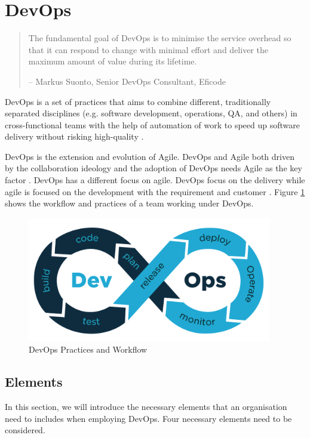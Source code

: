 \section{DevOps}
\begin{quotation}
    The fundamental goal of DevOps is to minimise the service overhead so that it can respond to change with minimal effort and deliver the maximum amount of value during its lifetime.
    \begin{flushright}
        -- Markus Suonto, Senior DevOps Consultant, Eficode
    \end{flushright}
\end{quotation}
\label{devops}
DevOps is a set of practices that aims to combine different, traditionally separated disciplines (e.g. software development, operations, QA, and others) in cross-functional teams with the help of automation of work to speed up software delivery without risking high-quality \cite{bass2015devops}.
\par
DevOps is the extension and evolution \cite{lwakatare2016relationship}\cite{leite2019survey} of Agile. DevOps and Agile both driven by the collaboration ideology and the adoption of DevOps needs Agile as the key factor \cite{lwakatare2016relationship}. DevOps has a different focus on agile. DevOps focus on the delivery while agile is focused on the development with the requirement and customer \cite{buchanan2015agile}. Figure \ref{fig:DevOps} shows the workflow and practices of a team working under DevOps.
\begin{figure}[h]
    \centering
    \includegraphics[width=0.95\textwidth]{pics/DevOps.png}
    \caption{DevOps Practices and Workflow \cite{DevOpsin72:online}}
    \label{fig:DevOps}
\end{figure}
\subsection{Elements}
In this section, we will introduce the necessary elements that an organisation need to includes when employing DevOps. Four necessary elements need to be considered.
